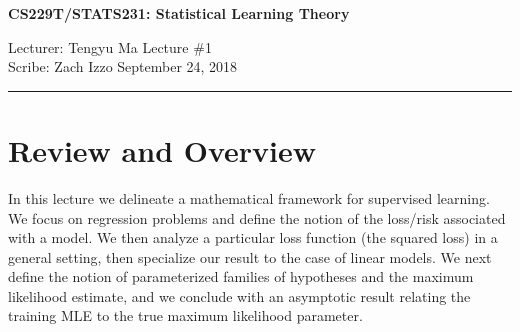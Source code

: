 \documentclass[11pt]{article}
\begin{document}
\thispagestyle{empty}

\begin{center}
\bf\large CS229T/STATS231: Statistical Learning Theory
\end{center}

\noindent
Lecturer: Tengyu Ma   %
\hfill
Lecture \#1               %
\\
Scribe: Zach Izzo                 %
\hfill
September 24, 2018           %

\noindent
\rule{\textwidth}{1pt}

\medskip


\section{Review and Overview}
In this lecture we delineate a mathematical framework for supervised learning. We focus on regression problems and define the notion of the loss/risk associated with a model. We then analyze a particular loss function (the squared loss) in a general setting, then specialize our result to the case of linear models. We next define the notion of parameterized families of hypotheses and the maximum likelihood estimate, and we conclude with an asymptotic result relating the training MLE to the true maximum likelihood parameter.

\newcommand{\cX}{\mathcal{X}}
\newcommand{\cY}{\mathcal{Y}}
\end{document}
